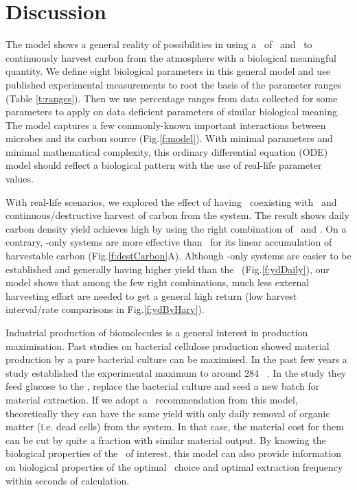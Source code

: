 \documentclass[../thesis.tex]{subfiles} %
\begin{document}
\section{Discussion}
The model shows a general reality of possibilities in using a \pbs\ of \bac\ and \phy\ to continuously harvest carbon from the atmosphere with a biological meaningful quantity.  We define eight biological parameters in this general model and use published experimental measurements to root the basis of the parameter ranges (Table \ref{t:ranges}).  Then we use percentage ranges from data collected for some parameters to apply on data deficient parameters of similar biological meaning.  The model captures a few commonly-known important interactions between microbes and its carbon source (Fig.\ref{f:model}).  With minimal parameters and minimal mathematical complexity, this ordinary differential equation (ODE) model should reflect a biological pattern with the use of real-life parameter values.

With real-life scenarios, we explored the effect of having \bac\ coexisting with \phy\ and continuous/destructive harvest of carbon from the system.  The result shows daily carbon density yield achieves high by using the right combination of \phy\ and \bac.  On a contrary, \phy-only systems are more effective than \pbs\ for its linear accumulation of harvestable carbon (Fig.\ref{f:destCarbon}A).  Although \phy-only systems are easier to be established and generally having higher yield than the \pbs\ (Fig.\ref{f:ydDaily}), our model shows that among the few right combinations, much less external harvesting effort are needed to get a general high return (low harvest interval/rate comparisons in Fig.\ref{f:ydByHarv}).

Industrial production of biomolecules is a general interest in production maximisation.  Past studies on bacterial cellulose production showed material production by a pure bacterial culture can be maximised.  In the past few years a study established the experimental maximum to around 284 \dxdt\ \autocite{aytekin2016statistical}.  In the study they feed glucose to the \bac, replace the bacterial culture and seed a new batch for material extraction.  If we adopt a \phy\ recommendation from this model, theoretically they can have the same yield with only daily removal of organic matter (i.e. dead cells) from the system.  In that case, the material cost for them can be cut by quite a fraction with similar material output.  By knowing the biological properties of the \bac\ of interest, this model can also provide information on biological properties of the optimal \phy\ choice and optimal extraction frequency within seconds of calculation.
\end{document}
